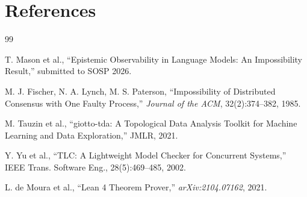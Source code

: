 \documentclass[12pt]{article}
\begin{document}

\section*{References}

\begin{thebibliography}{99}

 T. Mason et al., ``Epistemic Observability in Language Models: An Impossibility Result,'' submitted to SOSP 2026.

 M. J. Fischer, N. A. Lynch, M. S. Paterson, ``Impossibility of Distributed Consensus with One Faulty Process,'' \textit{Journal of the ACM}, 32(2):374--382, 1985.

 M. Tauzin et al., ``giotto-tda: A Topological Data Analysis Toolkit for Machine Learning and Data Exploration,'' JMLR, 2021.

 Y. Yu et al., ``TLC: A Lightweight Model Checker for Concurrent Systems,'' IEEE Trans. Software Eng., 28(5):469--485, 2002.

 L. de Moura et al., ``Lean 4 Theorem Prover,'' \textit{arXiv:2104.07162}, 2021.

\end{thebibliography}
\end{document}
